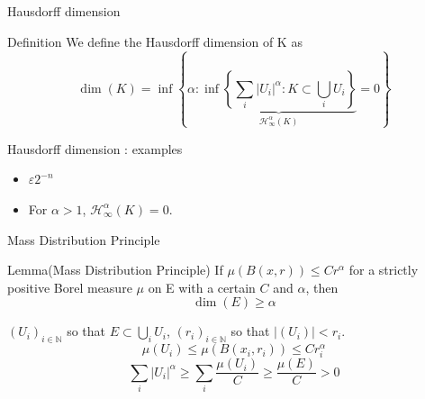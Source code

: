 \documentclass[t]{beamer}
\begin{document}
\begin{frame}{Hausdorff dimension}
    \begin{exampleblock}{Definition}
       We define the Hausdorff dimension of K as
       $$
       \dim(K) = \inf\left\{ \alpha: \underbrace{\inf \left\{ \sum_i |U_i|^\alpha : K \subset \bigcup_i U_i \right\}}_{\mathcal{H}^\alpha_\infty(K)} = 0 \right\}
       $$
    \end{exampleblock}
\end{frame}

\begin{frame}{Hausdorff dimension : examples}
    \begin{itemize}
        \item $\varepsilon 2^{-n}$
        \item{For $\alpha > 1$, $\mathcal{H}^{\alpha}_{\infty}(K) = 0$}.
    \end{itemize}
\end{frame}

\begin{frame}{Mass Distribution Principle}
    \begin{block}{Lemma(Mass Distribution Principle)}
        If $\mu(B(x, r)) \le Cr^\alpha$ for a strictly positive Borel measure $\mu$ on E with a certain $C$ and $\alpha$, then
        $$
        \dim(E) \ge \alpha
        $$
    \end{block}
    $(U_i)_{i\in \mathbb{N}}$ so that $E \subset \bigcup_i U_i$, $(r_i)_{i\in \mathbb{N}}$ so that $|(U_i)| < r_i$.
    $$
    \mu(U_i) \le \mu\left( B(x_i, r_i) \right) \le C r_i^\alpha
    $$
    $$
    \sum_i |U_i|^\alpha \ge \sum_i \frac{\mu(U_i)}{C} \ge \frac{\mu(E)}{C} > 0
    $$
\end{frame}
\end{document}
